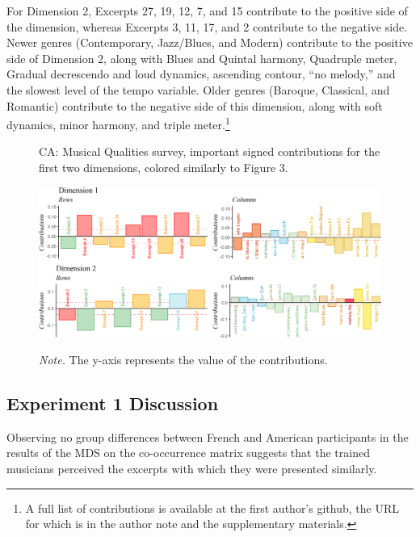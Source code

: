 \documentclass[
  english,
  man,floatsintext]{apa6}
\begin{document}
For Dimension 2, Excerpts 27, 19, 12, 7, and 15 contribute to the positive side of the dimension, whereas Excerpts 3, 11, 17, and 2 contribute to the negative side. Newer genres (Contemporary, Jazz/Blues, and Modern) contribute to the positive side of Dimension 2, along with Blues and Quintal harmony, Quadruple meter, Gradual decrescendo and loud dynamics, ascending contour, ``no melody,'' and the slowest level of the tempo variable. Older genres (Baroque, Classical, and Romantic) contribute to the negative side of this dimension, along with soft dynamics, minor harmony, and triple meter.\footnote{A full list of contributions is available at the first author's github, the URL for which is in the author note and the supplementary materials.}

\begin{figure}   
  \centering  
  \caption{CA: Musical Qualities survey, important signed contributions for the first two dimensions, colored similarly to Figure 3.}
    \includegraphics{./Music-Descriptor-Space_files/figure-latex/contributionsQcode-1.png}
  \label{fig:contributionsQ}
  \caption*{\footnotesize \textit{Note.} The y-axis represents the value of the contributions.}
\end{figure}

\hypertarget{experiment-1-discussion}{%
\subsection{Experiment 1 Discussion}\label{experiment-1-discussion}}

Observing no group differences between French and American participants in the results of the MDS on the co-occurrence matrix suggests that the trained musicians perceived the excerpts with which they were presented similarly.
\end{document}
